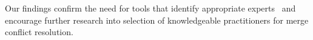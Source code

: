 
Our findings confirm the need for tools that identify appropriate experts~\cite{CostaSarma} and encourage further research into selection of knowledgeable practitioners for merge conflict resolution.



